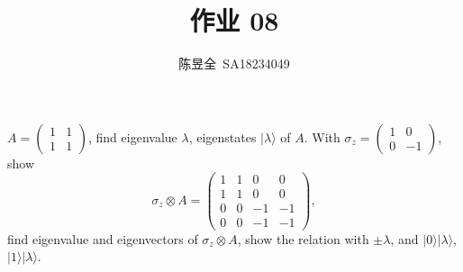 \documentclass[UTF8,12pt]{article} %
\begin{document}
\title{作业 08}
\author{陈昱全~SA18234049}
\date{} %
\maketitle

\begin{exercise}{}{}
$A = \begin{pmatrix}1&1\\1&1\end{pmatrix}$, find eigenvalue $\lambda$, eigenstates $|\lambda\rangle$ of $A$. With $\sigma_{z} = \begin{pmatrix}1&0\\0&-1\end{pmatrix}$, show
$$\sigma_{z} \otimes A = \begin{pmatrix}1&1&0&0\\1&1&0&0\\0&0&-1&-1\\0&0&-1&-1\end{pmatrix},$$
find eigenvalue and eigenvectors of $\sigma_{z}\otimes A$, show the relation with $\pm\lambda$, and $|0\rangle|\lambda\rangle$, $|1\rangle|\lambda\rangle$.
\end{exercise}
\end{document}
